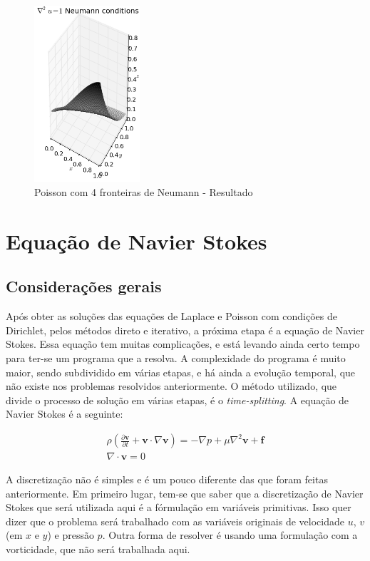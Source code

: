 \documentclass[journal]{IEEEtran}
\begin{document}
\begin{figure}[ht!]
\centering
\includegraphics[width = 0.35\textwidth]{figures/poisson_neumann_03.png}
\caption{Poisson com 4 fronteiras de Neumann - Resultado\label{poisson_neumann}}
\end{figure}

\section{Equação de Navier Stokes}
\subsection*{Considerações gerais}
Após obter as soluções das equações de Laplace e Poisson com condições de Dirichlet, pelos métodos direto e iterativo, a próxima etapa é a equação de Navier Stokes. Essa equação tem muitas complicações, e está levando ainda certo tempo para ter-se um programa que a resolva. A complexidade do programa é muito maior, sendo subdividido em várias etapas, e há ainda a evolução temporal, que não existe nos problemas resolvidos anteriormente. O método utilizado, que divide o processo de solução em várias etapas, é o \textit{time-splitting}\cite{time_splitting}. A equação de Navier Stokes é a seguinte:

\begin{eqnarray}
\rho\left( \frac{\partial \textbf{v}}{\partial
t}+\textbf{v}\cdot\nabla\textbf{v}\right)=-\nabla
p+\mu\nabla^2\textbf{v}+\textbf{f} \label{ns}\\
 \nabla\cdot \textbf{v}=0 \label{divergente_zero}
\end{eqnarray}

A discretização não é simples e é um pouco diferente das que foram feitas anteriormente. Em primeiro lugar, tem-se que saber que a discretização de Navier Stokes que será utilizada aqui é a fórmulação em variáveis primitivas\cite{notas_de_aula_john}. Isso quer dizer que o problema será trabalhado com as variáveis originais de velocidade $u$, $v$ (em $x$ e $y$) e pressão $p$. Outra forma de resolver é usando uma formulação com a vorticidade, que não será trabalhada aqui\cite{notas_de_aula_john}.
\end{document}
